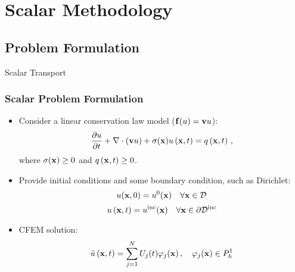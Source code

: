 \section{Scalar Methodology}
\subsection{Problem Formulation}
\begin{frame}
\begin{center}
  \Huge{\textcolor{myblue}{Scalar Transport}}
\end{center}
\end{frame}
\begin{frame}
\frametitle{Scalar Problem Formulation}

\begin{itemize}
  \item Consider a linear conservation law model
    ($\mathbf{f}(u)=\mathbf{v}u$):
    \begin{equation}
      \frac{\partial u}{\partial t} + \nabla\cdot(\mathbf{v}u)
      + \sigma(\mathbf{x})u\left(\mathbf{x},t\right) = q\left(\mathbf{x},t\right) \,,
    \end{equation}
    where $\sigma(\mathbf{x})\ge 0$ and $q\left(\mathbf{x},t\right)\ge 0$.
  \item Provide initial conditions and some boundary
    condition, such as Dirichlet:
   \begin{equation}
      u(\mathbf{x},0) = u^0(\mathbf{x}) \quad \forall \mathbf{x}\in \mathcal{D}
   \end{equation}
   \begin{equation}
      u\left(\mathbf{x},t\right) = u^{\text{inc}}(\mathbf{x}) \quad \forall \mathbf{x}\in \partial\mathcal{D}^{\textup{inc}}
   \end{equation}
   \item CFEM solution:
   \begin{equation}
      \tilde{u}\left(\mathbf{x},t\right) = \sum\limits_{j=1}^N U_j(t) \varphi_j(\mathbf{x}) \,,
      \quad \varphi_j(\mathbf{x})\in P^1_h
   \end{equation}
\end{itemize}

\end{frame}
